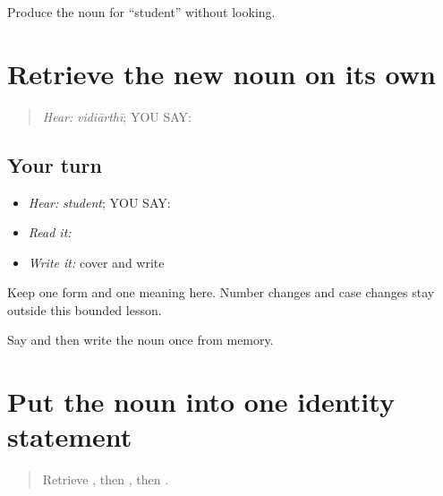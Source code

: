 \begin{tcolorbox}[breakable,colback=teal!4,colframe=teal!35!black,title={Before you move on}]
Produce the noun for “student” without looking.
\end{tcolorbox}
\section[\texorpdfstring{\pa{ਵਿਦਿਆਰਥੀ} (vidiarthii)}{ਵਿਦਿਆਰਥੀ (vidiarthii)}]{Retrieve the new noun on its own}

\label{lesson:PA-C194-vidiarthi-review}



\begin{quote}
\emph{Hear:} \emph{vidiārthī}; YOU SAY: \textbf{}
\end{quote}

\subsection*{Your turn}
\begin{itemize}
\raggedright
  \item \emph{Hear:} \emph{student}; YOU SAY: \textbf{}
  \item \emph{Read it:} \textbf{}
  \item \emph{Write it:} cover and write \textbf{}
\end{itemize}

\begin{grammarlens}[title={Grammar Lens}]
Keep one form and one meaning here. Number changes and case changes stay outside this bounded lesson.
\end{grammarlens}

\begin{tcolorbox}[breakable,colback=teal!4,colframe=teal!35!black,title={Before you move on}]
Say and then write the noun once from memory.
\end{tcolorbox}
\section[\texorpdfstring{\pa{ਉਹ} \pa{ਵਿਦਿਆਰਥੀ} \pa{ਹੈ} (oh vidiarthii hai)}{ਉਹ ਵਿਦਿਆਰਥੀ ਹੈ (oh vidiarthii hai)}]{Put the noun into one identity statement}

\label{lesson:PA-C194-student-frame}



\begin{quote}
Retrieve \textbf{}, then \textbf{}, then \textbf{}.
\end{quote}

